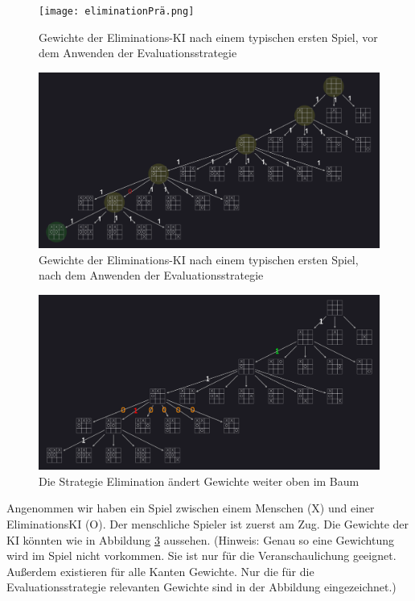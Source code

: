\documentclass[titlepage]{scrartcl}
\begin{document}
\begin{figure}[htb]
\texttt{[image: eliminationPrä.png]}
\caption{Gewichte der Eliminations-KI nach einem typischen ersten Spiel, vor dem Anwenden der Evaluationsstrategie}
\label{eliminationPrä}
\end{figure}
\begin{figure}[htb]
\includegraphics[width = \linewidth]{eliminationPost.png}
\caption{Gewichte der Eliminations-KI nach einem typischen ersten Spiel, nach dem Anwenden der Evaluationsstrategie}
\label{eliminationPost}
\end{figure}

\begin{figure}[htb]
\includegraphics[width = \linewidth]{elimination1.png}
\caption{Die Strategie Elimination ändert Gewichte weiter oben im Baum}
\label{elimination1}
\end{figure}

Angenommen wir haben ein Spiel zwischen einem Menschen (X) und einer EliminationsKI (O). Der menschliche Spieler ist zuerst am Zug. Die Gewichte der KI könnten wie in Abbildung \ref{elimination1} aussehen. (Hinweis: Genau so eine Gewichtung wird im Spiel nicht vorkommen. Sie ist nur für die Veranschaulichung geeignet. Außerdem existieren für alle Kanten Gewichte. Nur die für die Evaluationsstrategie relevanten Gewichte sind in der Abbildung eingezeichnet.) 
\end{document}
